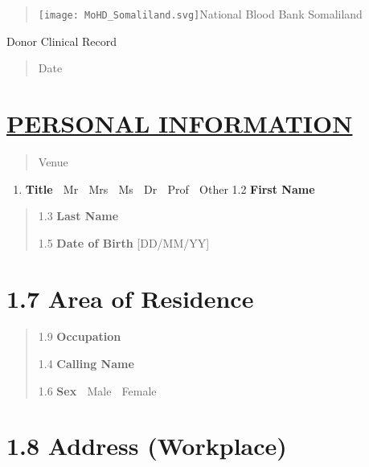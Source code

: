 \documentclass[]{article}
\author{}
\date{}
\begin{document}
\begin{quote}
\texttt{[image: MoHD\_Somaliland.svg]}National
Blood Bank Somaliland
\end{quote}

Donor Clinical Record

\begin{quote}
Date
\end{quote}

\hypertarget{personal-information}{%
\section{\texorpdfstring{\ul{PERSONAL
INFORMATION}}{PERSONAL INFORMATION}}\label{personal-information}}

\begin{quote}
Venue
\end{quote}

\begin{enumerate}
\def\labelenumi{\arabic{enumi}.}
\item
  \textbf{Title}  Mr  Mrs  Ms  Dr  Prof  Other 1.2 \textbf{First
  Name}
\end{enumerate}

\begin{quote}
1.3 \textbf{Last Name}

1.5 \textbf{Date of Birth} {[}DD/MM/YY{]}
\end{quote}

\hypertarget{area-of-residence}{%
\section*{\texorpdfstring{1.7 Area of Residence
}{1.7 Area of Residence }}\label{area-of-residence}}

\begin{quote}
1.9 \textbf{Occupation}

1.4 \textbf{Calling Name}

1.6 \textbf{Sex}  Male  Female
\end{quote}

\hypertarget{address-workplace}{%
\section*{\texorpdfstring{1.8 Address (Workplace)
}{1.8 Address (Workplace) }}\label{address-workplace}}
\end{document}
